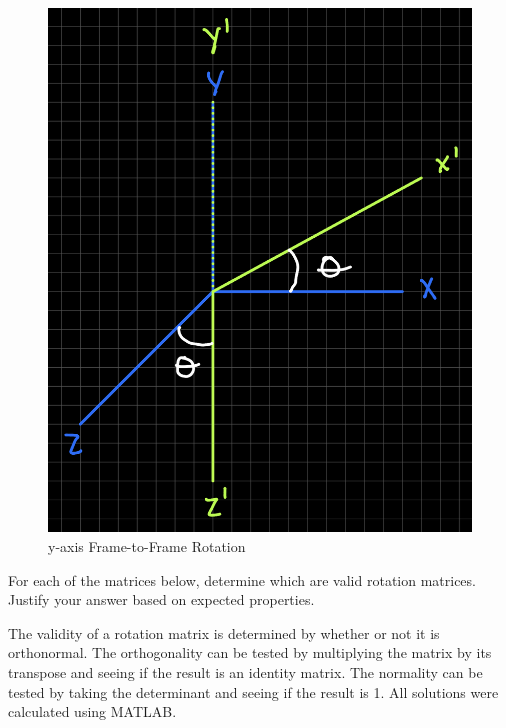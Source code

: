 \documentclass[12pt,letterpaper, onecolumn]{exam}
\begin{document}
\begin{questions}
\begin{parts}
        \begin{figure}[!h]
            \centering
            \includegraphics[scale=0.3]{assets/HW2_P3_FIG.png}
            \caption{y-axis Frame-to-Frame Rotation}
            \label{fig:yrot}
        \end{figure}

    \end{parts}

    \clearpage

    \question
    For each of the matrices below, determine which are valid rotation matrices. Justify your answer based on expected properties.

    \solution
    The validity of a rotation matrix is determined by whether or not it is orthonormal. The orthogonality can be tested by multiplying the matrix by its transpose and seeing if the result is an identity matrix. The normality can be tested by taking the determinant and seeing if the result is 1. All solutions were calculated using MATLAB.
\end{questions}
\end{document}
